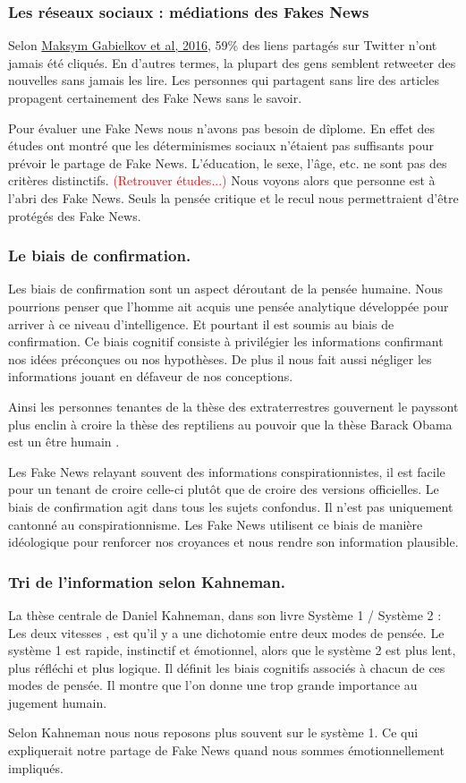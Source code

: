 
\subsubsection{Les réseaux sociaux : médiations des Fakes News}
Selon \href{https://hal.inria.fr/hal-01281190}{Maksym Gabielkov et al, 2016}, 59\% des liens partagés sur Twitter n'ont jamais été cliqués.
En d'autres termes, la plupart des gens semblent retweeter des nouvelles sans jamais les lire.
Les personnes qui partagent sans lire des articles propagent certainement des Fake News sans le savoir.

Pour évaluer une Fake News nous n'avons pas besoin de dîplome.
En effet des études ont montré que les déterminismes sociaux n'étaient pas suffisants pour prévoir le partage de Fake News.
L'éducation, le sexe, l'âge, etc. ne sont pas des critères distinctifs.
\textcolor{red}{(Retrouver études...)}
Nous voyons alors que personne est à l'abri des Fake News. Seuls la pensée critique et le recul nous permettraient d'être protégés des Fake News.


\subsubsection{Le biais de confirmation.}
Les biais de confirmation sont un aspect déroutant de la pensée humaine.
Nous pourrions penser que l'homme ait acquis une pensée analytique développée pour arriver à ce niveau d'intelligence.
Et pourtant il est soumis au biais de confirmation.
Ce biais cognitif consiste à privilégier les informations confirmant nos idées préconçues ou nos hypothèses.
De plus il nous fait aussi négliger les informations jouant en défaveur de nos conceptions.

Ainsi les personnes tenantes de la thèse \og des extraterrestres gouvernent le pays\fg sont plus enclin à croire la thèse \og des reptiliens au pouvoir \fg que la thèse \og Barack Obama est un être humain \fg.

Les Fake News relayant souvent des informations conspirationnistes, il est facile pour un tenant de croire celle-ci plutôt que de croire des versions officielles.
Le biais de confirmation agit dans tous les sujets confondus. Il n'est pas uniquement cantonné au conspirationnisme. Les Fake News utilisent ce biais de manière idéologique pour renforcer nos croyances et nous rendre son information plausible.

\subsubsection{Tri de l'information selon Kahneman.}
La thèse centrale de Daniel Kahneman, dans son livre \og Système 1 / Système 2 : Les deux vitesses \fg, est qu'il y a une dichotomie entre deux modes de pensée.
Le système 1 est rapide, instinctif et émotionnel, alors que le système 2 est plus lent, plus réfléchi et plus logique.
Il définit les biais cognitifs associés à chacun de ces modes de pensée.
Il montre que l'on donne une trop grande importance au jugement humain.

Selon Kahneman nous nous reposons plus souvent sur le système 1.
Ce qui expliquerait notre partage de Fake News quand nous sommes émotionnellement impliqués.
